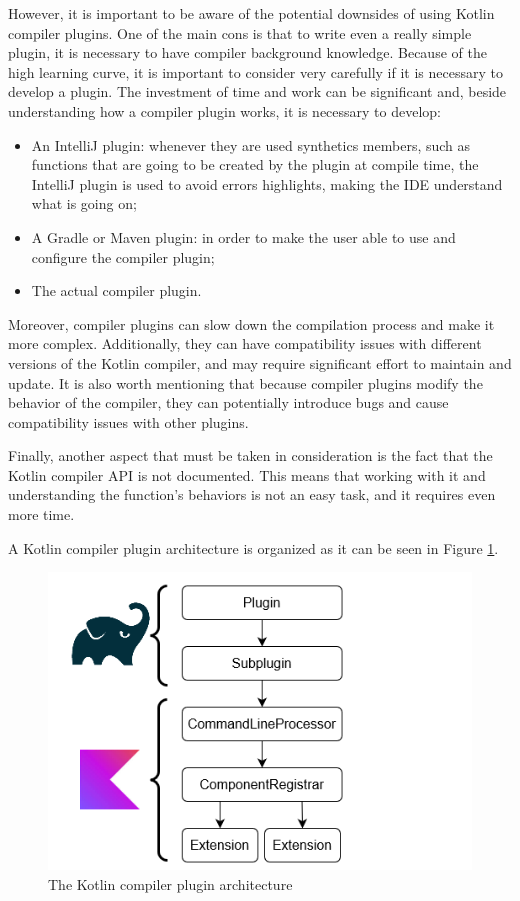 However, it is important to be aware of the potential downsides of using Kotlin compiler plugins. One of the main cons is that to write even a really simple plugin, it is necessary to have compiler background knowledge. Because of the high learning curve, it is important to consider very carefully if it is necessary to develop a plugin. The investment of time and work can be significant and, beside understanding how a compiler plugin works, it is necessary to develop:
\begin{itemize}
    \item An IntelliJ plugin: whenever they are used synthetics members, such as functions that are going to be created by the plugin at compile time, the IntelliJ plugin is used to avoid errors highlights, making the IDE understand what is going on;
    \item A Gradle or Maven plugin: in order to make the user able to use and configure the compiler plugin;
    \item The actual compiler plugin.
\end{itemize}

Moreover, compiler plugins can slow down the compilation process and make it more complex. Additionally, they can have compatibility issues with different versions of the Kotlin compiler, and may require significant effort to maintain and update. It is also worth mentioning that because compiler plugins modify the behavior of the compiler, they can potentially introduce bugs and cause compatibility issues with other plugins.

Finally, another aspect that must be taken in consideration is the fact that the Kotlin compiler API is not documented. This means that working with it and understanding the function's behaviors is not an easy task, and it requires even more time.

A Kotlin compiler plugin architecture is organized as it can be seen in Figure \ref{fig:kotlin_compiler_plugin_architecture}.

\begin{figure}[!ht]
    \centering
    \includegraphics[scale=0.8]{document/chapters/2-metaprogramming/images/kotlin_compiler_plugin_architecture.png}
    \caption{The Kotlin compiler plugin architecture \cite{compiler_plugins_jetbrains}}
    \label{fig:kotlin_compiler_plugin_architecture}
\end{figure}

